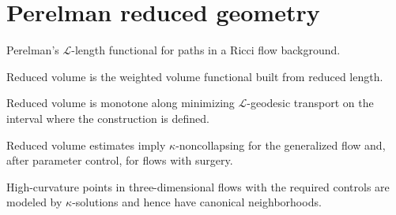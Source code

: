 \chapter{Perelman reduced geometry}

\begin{definition}
  \label{def:L-length}
  Perelman's $\mathcal L$-length functional for paths in a Ricci flow background.
\end{definition}

\begin{definition}
  \label{def:reduced-volume}
  Reduced volume is the weighted volume functional built from reduced length.
\end{definition}

\begin{theorem}
  \label{thm:reduced-volume-monotonicity}
  \notready
  Reduced volume is monotone along minimizing $\mathcal L$-geodesic transport on
  the interval where the construction is defined.
\end{theorem}

\begin{theorem}
  \label{thm:perelman-noncollapsing-with-surgery}
  \notready
  Reduced volume estimates imply $\kappa$-noncollapsing for the generalized flow
  and, after parameter control, for flows with surgery.
\end{theorem}

\begin{theorem}
  \label{thm:canonical-neighborhood-theorem}
  \notready
  High-curvature points in three-dimensional flows with the required controls are
  modeled by $\kappa$-solutions and hence have canonical neighborhoods.
\end{theorem}
